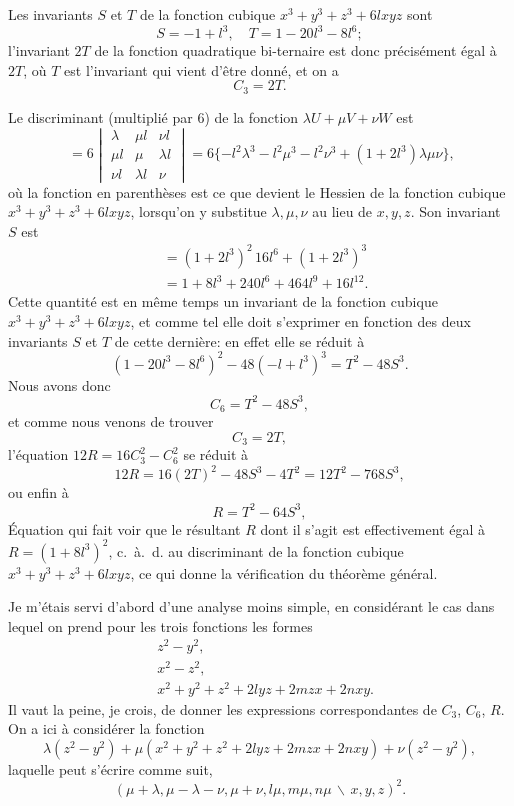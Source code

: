 \documentclass[11pt,a4paper]{article}
\theoremstyle{definition}
\begin{document}
Les invariants $S$ et $T$ de la fonction cubique $x^{3} + y^{3} + z^{3} + 6lxyz$ sont
\[S = -1 + l^{3}, \quad T = 1 - 20l^{3} - 8l^{6};\]
l'invariant $2T$ de la fonction quadratique bi-ternaire est donc pr\'{e}cis\'{e}ment
\'{e}gal \`{a} $2T$, o\`{u} $T$ est l'invariant qui vient d'\^{e}tre donn\'{e}, et on a
\[C_{3} = 2T.\]

Le discriminant (multipli\'{e} par $6$) de la fonction $\lambda U + \mu V + \nu W$ est
\[\;= 6\begin{vmatrix}\lambda & \mu l & \nu l \\ \mu l & \mu & \lambda l \\ \nu l & \lambda l & \nu\end{vmatrix}
= 6\{-l^{2}\lambda^{3} - l^{2}\mu^{3} - l^{2}\nu^{3} + (1+2l^{3})\lambda\mu\nu\},\]
o\`{u} la fonction en parenth\`{e}ses est ce que devient le Hessien de la fonction cubique
$x^{3}+y^{3}+z^{3}+6lxyz$, lorsqu'on y substitue $\lambda, \mu, \nu$ au lieu de $x,y,z$. Son
invariant $S$ est
\begin{align*}
&= (1+2l^{3})^{2}\,16l^{6} + (1+2l^{3})^{3} \\
&= 1 + 8l^{3} + 240l^{6} + 464l^{9} + 16l^{12}.
\end{align*}
Cette quantit\'{e} est en m\^{e}me temps un invariant de la fonction cubique
$x^{3} + y^{3} + z^{3} + 6lxyz$, et comme tel elle doit s'exprimer en fonction des deux
invariants $S$ et $T$ de cette derni\`{e}re: en effet elle se r\'{e}duit \`{a}
\[(1-20l^{3}-8l^{6})^{2} - 48(-l+l^{3})^{3} = T^{2} - 48S^{3}.\]
Nous avons donc
\[C_{6} = T^{2} - 48S^{3},\]
et comme nous venons de trouver
\[C_{3} = 2T,\]
l'\'{e}quation $12R = 16C_{3}^{2} - C_{6}^{2}$ se r\'{e}duit \`{a}
\[12R = 16(2T)^{2} - 48S^{3} - 4T^{2} = 12T^{2} - 768S^{3},\]
ou enfin \`{a}
\[R = T^{2} - 64S^{3},\]
\'{E}quation qui fait voir que le r\'{e}sultant $R$ dont il s'agit est effectivement
\'{e}gal \`{a} $R = (1+8l^{3})^{2}$, c.~\`{a}.~d. au discriminant de la fonction cubique
$x^{3} + y^{3} + z^{3} + 6lxyz$, ce qui donne la v\'{e}rification du th\'{e}or\`{e}me g\'{e}n\'{e}ral.

Je m'\'{e}tais servi d'abord d'une analyse moins simple, en consid\'{e}rant le cas
dans lequel on prend pour les trois fonctions les formes
\[
\begin{aligned}
&z^{2} - y^{2},\\
&x^{2} - z^{2},\\
&x^{2} + y^{2} + z^{2} + 2lyz + 2mzx + 2nxy.
\end{aligned}
\]
Il vaut la peine, je crois, de donner les expressions correspondantes de $C_{3}$, $C_{6}$, $R$.
On a ici \`{a} consid\'{e}rer la fonction
\[\lambda(z^{2}-y^{2}) + \mu(x^{2}+y^{2}+z^{2}+2lyz+2mzx+2nxy) + \nu(z^{2}-y^{2}),\]
laquelle peut s'\'{e}crire comme suit,
\[(\mu+\lambda, \mu-\lambda-\nu, \mu+\nu, l\mu, m\mu, n\mu\,\backslash\!\!\,x,y,z)^{2}.\]
\end{document}
